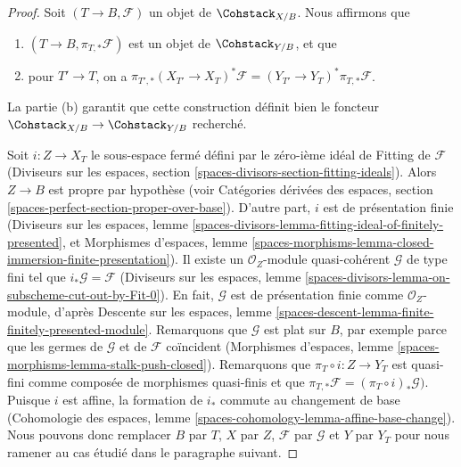 \begin{proof}
Soit $(T \to B, \mathcal{F})$ un objet de $\Cohstack_{X/B}$.
Nous affirmons que
\begin{enumerate}
\item[(a)] $(T \to B, \pi_{T, *}\mathcal{F})$ est un objet de
$\Cohstack_{Y/B}$, et que
\item[(b)] pour $T' \to T$, on a
$\pi_{T', *}(X_{T'} \to X_T)^*\mathcal{F} =
(Y_{T'} \to Y_T)^*\pi_{T, *}\mathcal{F}$.
\end{enumerate}
La partie (b) garantit que cette construction définit bien le foncteur
$\Cohstack_{X/B} \to \Cohstack_{Y/B}$ recherché.

\medskip\noindent
Soit $i : Z \to X_T$ le sous-espace fermé défini par le zéro-ième idéal
de Fitting de $\mathcal{F}$ (Diviseurs sur les espaces, section
\ref{spaces-divisors-section-fitting-ideals}).
Alors $Z \to B$ est propre par hypothèse (voir Catégories dérivées des
espaces, section \ref{spaces-perfect-section-proper-over-base}).
D'autre part, $i$ est de présentation finie (Diviseurs sur les espaces,
lemme \ref{spaces-divisors-lemma-fitting-ideal-of-finitely-presented}, et
Morphismes d'espaces, lemme
\ref{spaces-morphisms-lemma-closed-immersion-finite-presentation}).
Il existe un $\mathcal{O}_Z$-module quasi-cohérent $\mathcal{G}$ de type
fini tel que $i_*\mathcal{G} = \mathcal{F}$ (Diviseurs sur les espaces,
lemme \ref{spaces-divisors-lemma-on-subscheme-cut-out-by-Fit-0}).
En fait, $\mathcal{G}$ est de présentation finie comme
$\mathcal{O}_Z$-module, d'après Descente sur les espaces, lemme
\ref{spaces-descent-lemma-finite-finitely-presented-module}.
Remarquons que $\mathcal{G}$ est plat sur $B$, par exemple parce que les
germes de $\mathcal{G}$ et de $\mathcal{F}$ coïncident (Morphismes
d'espaces, lemme \ref{spaces-morphisms-lemma-stalk-push-closed}).
Remarquons que $\pi_T \circ i : Z \to Y_T$ est quasi-fini comme composée
de morphismes quasi-finis et que
$\pi_{T, *}\mathcal{F} = (\pi_T \circ i)_*\mathcal{G})$.
Puisque $i$ est affine, la formation de $i_*$ commute au changement de base
(Cohomologie des espaces, lemme
\ref{spaces-cohomology-lemma-affine-base-change}).
Nous pouvons donc remplacer $B$ par $T$, $X$ par $Z$,
$\mathcal{F}$ par $\mathcal{G}$ et $Y$ par $Y_T$ pour nous ramener au cas
étudié dans le paragraphe suivant.


\end{proof}
